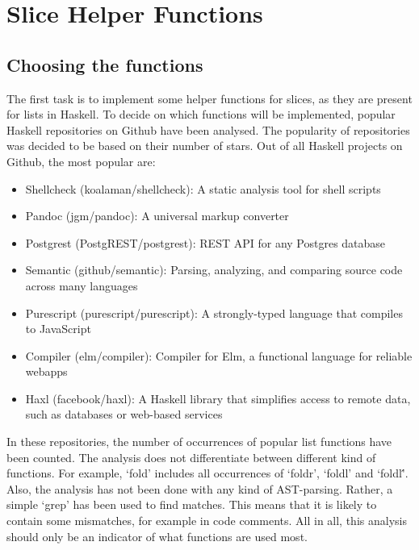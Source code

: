 \section{Slice Helper Functions}

\subsection{Choosing the functions}

The first task is to implement some helper functions for slices, as they are present
for lists in Haskell. To decide on which functions will be implemented, popular
Haskell repositories on Github have been analysed. The popularity of repositories
was decided to be based on their number of stars. Out of all Haskell projects
on Github, the most popular are\autocite{github-popular-haskell}:

\begin{itemize}
    \item Shellcheck (koalaman/shellcheck\autocite{github-shellcheck}): A static analysis tool for shell scripts
    \item Pandoc (jgm/pandoc\autocite{github-pandoc}): A universal markup converter
    \item Postgrest (PostgREST/postgrest\autocite{github-postgrest}): REST API for any Postgres database
    \item Semantic (github/semantic\autocite{github-semantic}): Parsing, analyzing, and comparing source code across many languages
    \item Purescript (purescript/purescript\autocite{github-purescript}): A strongly-typed language that compiles to JavaScript
    \item Compiler (elm/compiler\autocite{github-elmcompiler}): Compiler for Elm, a functional language for reliable webapps
    \item Haxl (facebook/haxl\autocite{github-haxl}): A Haskell library that simplifies access to remote data, such as databases or web-based services
\end{itemize}

In these repositories, the number of occurrences of popular list functions have
been counted. The analysis does not differentiate between different kind of
functions. For example, `fold' includes all occurrences of `foldr', `foldl' and
`foldl\''. Also, the analysis has not been done with any kind of AST-parsing.
Rather, a simple `grep' has been used to find matches. This means that it is
likely to contain some mismatches, for example in code comments. All in all,
this analysis should only be an indicator of what functions are used most.

